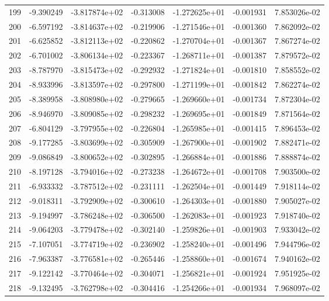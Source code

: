 \begin{tabular}{rrrrrrr}
 199 &  -9.390249 & -3.817874e+02 & -0.313008 & -1.272625e+01 &   -0.001931 &  7.853026e-02 \\
 200 &  -6.597192 & -3.814637e+02 & -0.219906 & -1.271546e+01 &   -0.001360 &  7.862092e-02 \\
 201 &  -6.625852 & -3.812113e+02 & -0.220862 & -1.270704e+01 &   -0.001367 &  7.867274e-02 \\
 202 &  -6.701002 & -3.806134e+02 & -0.223367 & -1.268711e+01 &   -0.001387 &  7.879572e-02 \\
 203 &  -8.787970 & -3.815473e+02 & -0.292932 & -1.271824e+01 &   -0.001810 &  7.858552e-02 \\
 204 &  -8.933996 & -3.813597e+02 & -0.297800 & -1.271199e+01 &   -0.001842 &  7.862274e-02 \\
 205 &  -8.389958 & -3.808980e+02 & -0.279665 & -1.269660e+01 &   -0.001734 &  7.872304e-02 \\
 206 &  -8.946970 & -3.809085e+02 & -0.298232 & -1.269695e+01 &   -0.001849 &  7.871564e-02 \\
 207 &  -6.804129 & -3.797955e+02 & -0.226804 & -1.265985e+01 &   -0.001415 &  7.896453e-02 \\
 208 &  -9.177285 & -3.803699e+02 & -0.305909 & -1.267900e+01 &   -0.001902 &  7.882471e-02 \\
 209 &  -9.086849 & -3.800652e+02 & -0.302895 & -1.266884e+01 &   -0.001886 &  7.888874e-02 \\
 210 &  -8.197128 & -3.794016e+02 & -0.273238 & -1.264672e+01 &   -0.001708 &  7.903500e-02 \\
 211 &  -6.933332 & -3.787512e+02 & -0.231111 & -1.262504e+01 &   -0.001449 &  7.918114e-02 \\
 212 &  -9.018311 & -3.792909e+02 & -0.300610 & -1.264303e+01 &   -0.001880 &  7.905027e-02 \\
 213 &  -9.194997 & -3.786248e+02 & -0.306500 & -1.262083e+01 &   -0.001923 &  7.918740e-02 \\
 214 &  -9.064203 & -3.779478e+02 & -0.302140 & -1.259826e+01 &   -0.001903 &  7.933042e-02 \\
 215 &  -7.107051 & -3.774719e+02 & -0.236902 & -1.258240e+01 &   -0.001496 &  7.944796e-02 \\
 216 &  -7.963387 & -3.776581e+02 & -0.265446 & -1.258860e+01 &   -0.001674 &  7.940162e-02 \\
 217 &  -9.122142 & -3.770464e+02 & -0.304071 & -1.256821e+01 &   -0.001924 &  7.951925e-02 \\
 218 &  -9.132495 & -3.762798e+02 & -0.304416 & -1.254266e+01 &   -0.001934 &  7.968097e-02 \\

\end{tabular}
